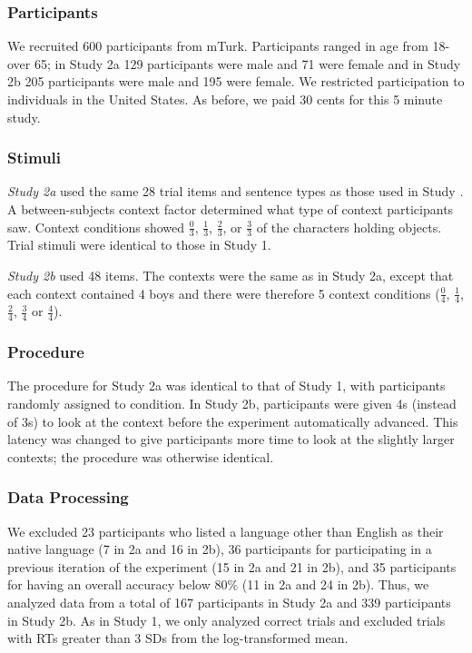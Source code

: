 \documentclass[10pt,letterpaper]{article}
\begin{document}
\subsubsection{Participants} 

We recruited 600 participants from mTurk. Participants ranged in age from 18-over 65; in Study 2a 129 participants were male and 71 were female and in Study 2b 205 participants were male and 195 were female.  We restricted participation to individuals in the United States. As before, we paid 30 cents for this 5 minute study.  

\subsubsection{Stimuli}

\emph{Study 2a} used the same 28 trial items and sentence types as those used in Study .  A between-subjects context factor determined what type of context participants saw.  Context conditions showed $\frac{0}{3}$, $\frac{1}{3}$, $\frac{2}{3}$, or $\frac{3}{3}$ of the characters holding objects.  Trial stimuli were identical to those in Study 1.  

\emph{Study 2b} used 48 items.  The contexts were the same as in Study 2a, except that each context contained 4 boys and there were therefore 5 context conditions ($\frac{0}{4}$, $\frac{1}{4}$, $\frac{2}{4}$, $\frac{3}{4}$ or $\frac{4}{4}$).  

\subsubsection{Procedure}
 The procedure for Study 2a was identical to that of Study 1, with participants randomly assigned to condition.   In Study 2b, participants were given 4s (instead of 3s) to look at the context before the experiment automatically advanced.  This latency was changed to give participants more time to look at the slightly larger contexts; the procedure was otherwise identical.
 
 \subsubsection{Data Processing}

We excluded 23 participants who listed a language other than English as their native language (7 in 2a and 16 in 2b), 36 participants for participating in a previous iteration of the experiment (15 in 2a and 21 in 2b), and 35 participants for having an overall accuracy below 80\% (11 in 2a and 24 in 2b).  Thus, we analyzed data from a total of 167 participants in Study 2a and 339 participants in Study 2b. As in Study 1, we only analyzed correct trials and excluded trials with RTs greater than 3 SDs from the log-transformed mean. 
\end{document}
